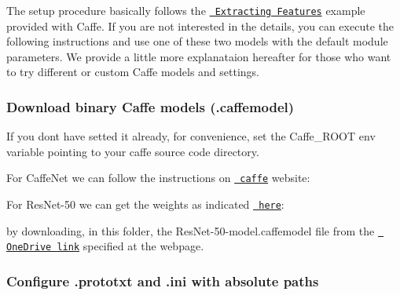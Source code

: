 The setup procedure basically follows the \href{http://caffe.berkeleyvision.org/gathered/examples/feature_extraction.html}{\texttt{ Extracting Features}} example provided with Caffe. If you are not interested in the details, you can execute the following instructions and use one of these two models with the default module parameters. We provide a little more explanataion hereafter for those who want to try different or custom Caffe models and settings.

\subsubsection*{Download binary Caffe models (.caffemodel)}

If you don\textquotesingle{}t have setted it already, for convenience, set the {\ttfamily Caffe\+\_\+\+R\+O\+OT} env variable pointing to your {\ttfamily caffe} source code directory.

For {\ttfamily Caffe\+Net} we can follow the instructions on \href{http://caffe.berkeleyvision.org/model_zoo.html}{\texttt{ caffe}} website\+:


\begin{DoxyCode}{0}
\end{DoxyCode}


For {\ttfamily Res\+Net-\/50} we can get the weights as indicated \href{https://github.com/KaimingHe/deep-residual-networks}{\texttt{ here}}\+:


\begin{DoxyCode}{0}
\end{DoxyCode}


by downloading, in this folder, the {\ttfamily Res\+Net-\/50-\/model.\+caffemodel} file from the \href{https://onedrive.live.com/?authkey=%21AAFW2-FVoxeVRck&id=4006CBB8476FF777%2117887&cid=4006CBB8476FF777}{\texttt{ One\+Drive link}} specified at the webpage.

\subsubsection*{Configure .prototxt and .ini with absolute paths}

